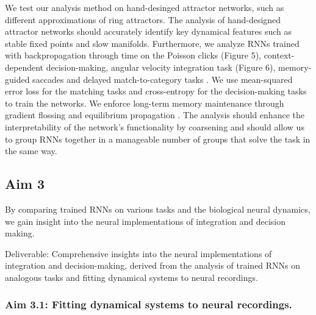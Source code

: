 \documentclass[12pt,letterpaper, onecolumn]{article}
\theoremstyle{definition}
\theoremstyle{remark}
\begin{document}
We test our analysis method on hand-desinged attractor networks, such as different approximations of ring attractors.
The analysis of hand-designed attractor networks should accurately identify key dynamical features such as stable fixed points and slow manifolds.
%
Furthermore, we analyze RNNs trained with backpropagation through time on the Poisson clicks (Figure 5), context-dependent decision-making, angular velocity integration task (Figure 6), memory-guided saccades  and delayed match-to-category tasks \citep{farrell2022, schuessler2020}.
We use mean-squared error loss for the matching tasks and cross-entropy for the decision-making tasks to train the networks.
We enforce long-term  memory maintenance through gradient flossing \citep{engelken2023b} and equilibrium propagation \citep{laborieux2023}.
The analysis should enhance the interpretability of the network's functionality by coarsening and should allow us to group RNNs together in a manageable number of groups that solve the task in the same way.





%
%






\newpage

\subsection*{Aim 3}

By comparing trained RNNs on various tasks and the biological neural dynamics, we gain insight into the neural implementations of integration and decision making.


\noindent
Deliverable:  Comprehensive insights into the neural implementations of integration and decision-making, derived from the analysis of trained RNNs on analogous tasks and fitting dynamical systems to neural recordings.

\subsubsection*{Aim 3.1: Fitting dynamical systems to neural recordings.}
\end{document}
